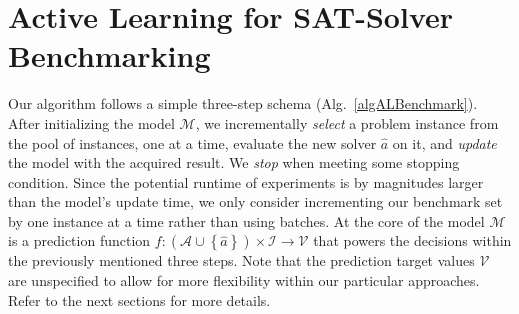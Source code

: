 \documentclass[runningheads]{llncs}
\begin{document}
\section{Active Learning for SAT-Solver Benchmarking}
\label{sec:main}
Our algorithm follows a simple three-step schema (Alg.~\ref{algALBenchmark}).
After initializing the model $\mathcal{M}$, we incrementally \emph{select} a problem instance from the pool of instances, one at a time, evaluate the new solver $\hat{a}$ on it, and \emph{update} the model with the acquired result.
We \emph{stop} when meeting some stopping condition.
Since the potential runtime of experiments is by magnitudes larger than the model's update time, we only consider incrementing our benchmark set by one instance at a time rather than using batches.
At the core of the model $\mathcal{M}$ is a prediction function $f\!: \left(\mathcal{A} \cup \left\lbrace \hat{a} \right\rbrace\right) \times \mathcal{I} \rightarrow \mathcal{V}$ that powers the decisions within the previously mentioned three steps.
Note that the prediction target values $\mathcal{V}$ are unspecified to allow for more flexibility within our particular approaches.
Refer to the next sections for more details.
\end{document}
